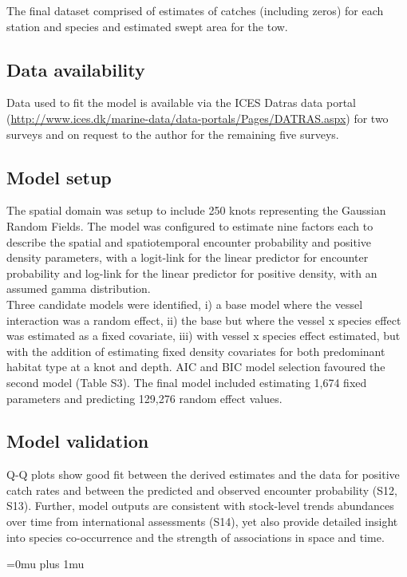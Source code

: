 \documentclass[fleqn,10pt]{wlscirep}
\begin{document}
\begin{linenumbers}
The final dataset comprised of estimates of catches (including zeros) for each
station and species and estimated swept area for the tow.\\

\subsection*{Data availability\\}

Data used to fit the model is available via the ICES Datras data portal
(\url{http://www.ices.dk/marine-data/data-portals/Pages/DATRAS.aspx}) for two
surveys and on request to the author for the remaining five surveys.\\

\subsection*{Model setup\\}

The spatial domain was set\added[id = CM]{ }up to include 250 knots representing the Gaussian
Random Fields. The model was configured to estimate nine factors each to describe
the spatial and spatiotemporal encounter probability and positive density
parameters, with a logit-link for the linear predictor for encounter
probability and log-link for the linear predictor for positive density, with an
assumed gamma distribution.\\

Three candidate models were identified, i) a base model where the vessel
interaction was a random effect, ii) the base but where the vessel x species
effect was estimated as a fixed covariate, iii) with vessel x species effect
estimated, but with the addition of estimating fixed density covariates for
both predominant habitat type at a knot and depth. AIC and BIC model selection
favoured the second model (Table S3). The final model included estimating 1,674
fixed parameters and predicting 129,276 random effect values.\\

\subsection*{Model validation\\}

Q-Q plots show good fit between the derived estimates and the data for positive
catch rates and between the predicted and observed encounter probability (S12,
S13).  Further, model outputs are consistent with stock-level trends abundances
over time from international assessments (S14), yet also provide detailed
insight into species co-occurrence and the strength of associations in space
and time. \\

\end{linenumbers}
\newpage
\Urlmuskip=0mu plus 1mu\relax
%

\end{document}
